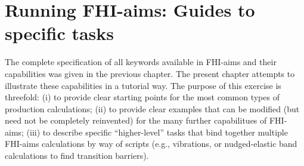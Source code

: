 \documentclass[12pt,a4paper,twoside,openany,titlepage,final]{book}
\begin{document}






































\chapter{Running FHI-aims: Guides to specific tasks}
\label{CH:running}

The complete specification of all keywords available in FHI-aims and
their capabilities was given in the previous chapter. The present
chapter attempts to illustrate these capabilities in a tutorial
way. The purpose of this exercise is threefold: (i) to provide clear
starting points for the most common types of production calculations;
(ii) to provide clear examples that can be modified (but need not be
completely reinvented) for the many further capabilitues of FHI-aims;
(iii) to describe specific ``higher-level'' tasks that bind together
multiple FHI-aims calculations by way of scripts (e.g., vibrations, or
nudged-elastic band calculations to find transition barriers).








\end{document}
